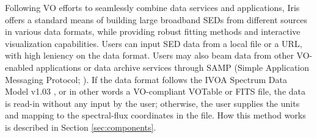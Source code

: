 \documentclass[preprint,12pt,3p]{elsarticle}
\begin{document}
Following VO efforts to seamlessly combine data services and applications, Iris offers a standard means of building large broadband SEDs from different sources in various data formats, while providing robust fitting methods and interactive visualization capabilities. Users can input SED data from a local file or a URL, with high leniency on the data format. Users may also beam data from other VO-enabled applications or data archive services through SAMP (Simple Application Messaging Protocol; \citet{2011arXiv1110.0528T}). If the data format follows the IVOA Spectrum Data Model v1.03 \citep{2012arXiv1204.3055M}, or in other words a VO-compliant VOTable or FITS file, the data is read-in without any input by the user; otherwise, the user supplies the units and mapping to the spectral-flux coordinates in the file. How this method works is described in Section \ref{sec:components}.



\end{document}
